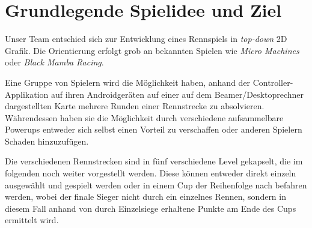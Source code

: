 \section{Grundlegende Spielidee und Ziel}

Unser Team entschied sich zur Entwicklung eines Rennspiels in \textit{top-down} 2D Grafik.
Die Orientierung erfolgt grob an bekannten Spielen wie \textit{Micro Machines} oder \textit{Black Mamba Racing}.

Eine Gruppe von Spielern wird die Möglichkeit haben, anhand der Controller-Applikation auf ihren Androidgeräten auf einer auf dem Beamer/Desktoprechner dargestellten Karte mehrere Runden einer Rennstrecke zu absolvieren. 
Währendessen haben sie die Möglichkeit durch verschiedene aufsammelbare Powerups entweder sich selbst einen Vorteil zu verschaffen oder anderen Spielern Schaden hinzuzufügen.

Die verschiedenen Rennstrecken sind in fünf verschiedene Level gekapselt, die im folgenden noch weiter vorgestellt werden.
Diese können entweder direkt einzeln ausgewählt und gespielt werden oder in einem Cup der Reihenfolge nach befahren werden, wobei der finale Sieger nicht durch ein einzelnes Rennen, sondern in diesem Fall anhand von durch Einzelsiege erhaltene Punkte am Ende des Cups ermittelt wird.
